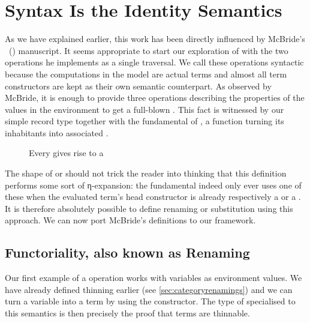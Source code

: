 \section{Syntax Is the Identity Semantics}
\label{sec:syntactic}

As we have explained earlier, this work has been directly influenced by
McBride's ~(\citeyear{mcbride2005type}) manuscript. It seems appropriate
to start our exploration of  with the two operations he
implements as a single traversal. We call these operations syntactic
because the computations in the model are actual terms and almost all term
constructors are kept as their own semantic counterpart. As observed by
McBride, it is enough to provide three operations describing the properties
of the values in the environment to get a full-blown . This
fact is witnessed by our simple  record type together with
the fundamental  of , a function turning its
inhabitants into associated .

\begin{figure}[h]
\caption{Every  gives rise to a \label{fig:syntactic}}
\end{figure}

The shape of  or  should not trick the reader
into thinking that this definition performs some sort of η-expansion:
the fundamental  indeed only ever uses one of these when the
evaluated term's head constructor is already respectively a 
or a . It is therefore absolutely possible to define renaming
or substitution using this approach. We can now port McBride's definitions
to our framework.


\subsection{Functoriality, also known as Renaming}

Our first example of a  operation works with variables as
environment values. We have already defined thinning earlier (see
\cref{sec:categoryrenamings}) and we can turn a variable into a term by using
the  constructor. The type of  specialised to this
semantics is then precisely the proof that terms are thinnable.

